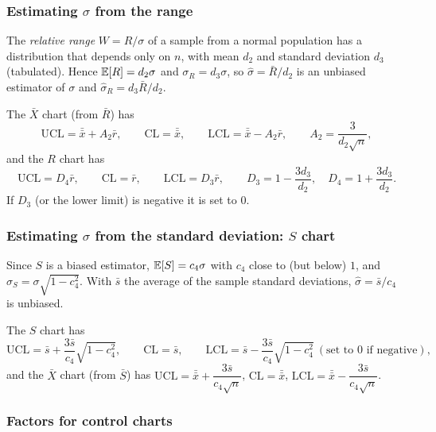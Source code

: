 \subsubsection*{Estimating $\sigma$ from the range}

The \emph{relative range} $W=R/\sigma$ of a sample from a normal population has a distribution that depends only on $n$, with mean $d_2$ and standard deviation $d_3$ (tabulated). Hence $\mathbb{E}[R]=d_2\sigma$ and $\sigma_R=d_3\sigma$, so $\hat\sigma=\bar{R}/d_2$ is an unbiased estimator of $\sigma$ and $\hat\sigma_R=d_3\bar{R}/d_2$.

\begin{theorem}\label{thm:xbarR}
The $\bar{X}$ chart (from $\bar{R}$) has
\[ \mathrm{UCL}=\bar{\bar{x}}+A_2\bar{r},\qquad\mathrm{CL}=\bar{\bar{x}},\qquad\mathrm{LCL}=\bar{\bar{x}}-A_2\bar{r},\qquad A_2=\frac3{d_2\sqrt n}, \]
and the $R$ chart has
\[ \mathrm{UCL}=D_4\bar{r},\qquad\mathrm{CL}=\bar{r},\qquad\mathrm{LCL}=D_3\bar{r},\qquad D_3=1-\frac{3d_3}{d_2},\quad D_4=1+\frac{3d_3}{d_2}. \]
If $D_3$ (or the lower limit) is negative it is set to $0$.
\end{theorem}

\subsubsection*{Estimating $\sigma$ from the standard deviation: $S$ chart}

Since $S$ is a biased estimator, $\mathbb{E}[S]=c_4\sigma$ with $c_4$ close to (but below) $1$, and $\sigma_S=\sigma\sqrt{1-c_4^2}$. With $\bar{s}$ the average of the sample standard deviations, $\hat\sigma=\bar{s}/c_4$ is unbiased.

\begin{theorem}\label{thm:xbarS}
The $S$ chart has
\[ \mathrm{UCL}=\bar{s}+\frac{3\bar{s}}{c_4}\sqrt{1-c_4^2},\qquad\mathrm{CL}=\bar{s},\qquad\mathrm{LCL}=\bar{s}-\frac{3\bar{s}}{c_4}\sqrt{1-c_4^2}\ (\text{set to }0\text{ if negative}), \]
and the $\bar{X}$ chart (from $\bar{S}$) has $\mathrm{UCL}=\bar{\bar{x}}+\dfrac{3\bar{s}}{c_4\sqrt n}$, $\mathrm{CL}=\bar{\bar{x}}$, $\mathrm{LCL}=\bar{\bar{x}}-\dfrac{3\bar{s}}{c_4\sqrt n}$.
\end{theorem}

\subsubsection*{Factors for control charts}

